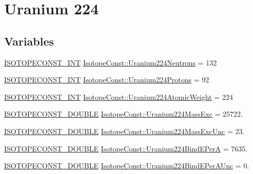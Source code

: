 \hypertarget{group___isotope_const-_uranium-_u224}{}\section{Uranium 224}
\label{group___isotope_const-_uranium-_u224}
\subsection*{Variables}
\begin{DoxyCompactItemize}
\item 
\mbox{\hyperlink{group___isotope_const-_macros_ga5f18360b3e99483a35c32d789e62621c}{I\+S\+O\+T\+O\+P\+E\+C\+O\+N\+S\+T\+\_\+\+I\+NT}} \mbox{\hyperlink{group___isotope_const-_uranium-_u224_ga961eb9d36cb4e22532a6be5b528929cb}{Isotope\+Const\+::\+Uranium224\+Neutrons}} = 132
\item 
\mbox{\hyperlink{group___isotope_const-_macros_ga5f18360b3e99483a35c32d789e62621c}{I\+S\+O\+T\+O\+P\+E\+C\+O\+N\+S\+T\+\_\+\+I\+NT}} \mbox{\hyperlink{group___isotope_const-_uranium-_u224_ga5fa7fdbce15ac4d1fd0da8de67e4ca2b}{Isotope\+Const\+::\+Uranium224\+Protons}} = 92
\item 
\mbox{\hyperlink{group___isotope_const-_macros_ga5f18360b3e99483a35c32d789e62621c}{I\+S\+O\+T\+O\+P\+E\+C\+O\+N\+S\+T\+\_\+\+I\+NT}} \mbox{\hyperlink{group___isotope_const-_uranium-_u224_ga92b55c5ea4ae8e129e4dd3b92482317a}{Isotope\+Const\+::\+Uranium224\+Atomic\+Weight}} = 224
\item 
\mbox{\hyperlink{group___isotope_const-_macros_ga8f45a7272ce02c0b4c65c44636ed719a}{I\+S\+O\+T\+O\+P\+E\+C\+O\+N\+S\+T\+\_\+\+D\+O\+U\+B\+LE}} \mbox{\hyperlink{group___isotope_const-_uranium-_u224_ga97b5d536627707eeee9f38a676d9a6b8}{Isotope\+Const\+::\+Uranium224\+Mass\+Exc}} = 25722.
\item 
\mbox{\hyperlink{group___isotope_const-_macros_ga8f45a7272ce02c0b4c65c44636ed719a}{I\+S\+O\+T\+O\+P\+E\+C\+O\+N\+S\+T\+\_\+\+D\+O\+U\+B\+LE}} \mbox{\hyperlink{group___isotope_const-_uranium-_u224_gabce27a9089dfb90add5a97b2c341d991}{Isotope\+Const\+::\+Uranium224\+Mass\+Exc\+Unc}} = 23.
\item 
\mbox{\hyperlink{group___isotope_const-_macros_ga8f45a7272ce02c0b4c65c44636ed719a}{I\+S\+O\+T\+O\+P\+E\+C\+O\+N\+S\+T\+\_\+\+D\+O\+U\+B\+LE}} \mbox{\hyperlink{group___isotope_const-_uranium-_u224_ga4ccc8e2c470cae3d41a1a4a144d6f164}{Isotope\+Const\+::\+Uranium224\+Bind\+E\+PerA}} = 7635.
\item 
\mbox{\hyperlink{group___isotope_const-_macros_ga8f45a7272ce02c0b4c65c44636ed719a}{I\+S\+O\+T\+O\+P\+E\+C\+O\+N\+S\+T\+\_\+\+D\+O\+U\+B\+LE}} \mbox{\hyperlink{group___isotope_const-_uranium-_u224_ga18e5e5eeee91ea148e7a2b6ca338f0c9}{Isotope\+Const\+::\+Uranium224\+Bind\+E\+Per\+A\+Unc}} = 0.

\end{DoxyCompactItemize}
